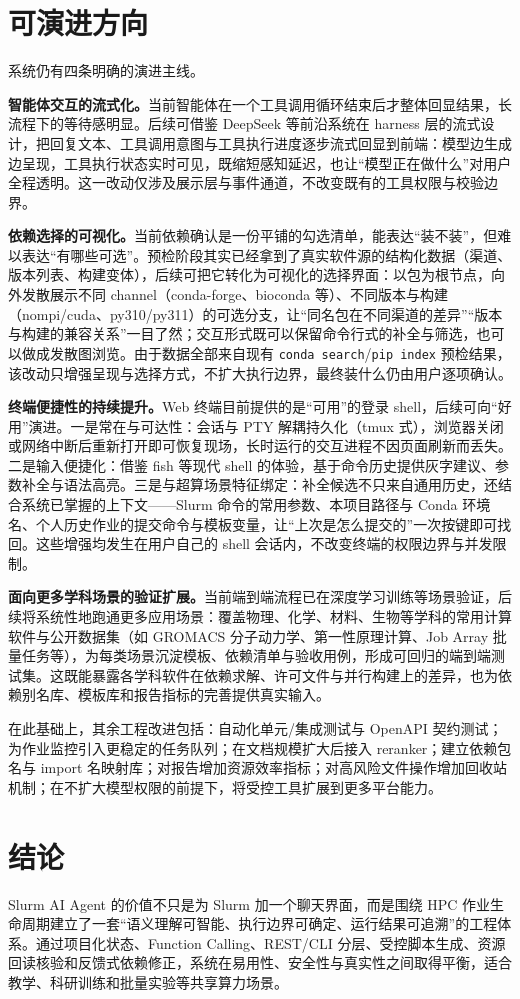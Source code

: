 \documentclass[UTF8,11pt,a4paper]{ctexart}
\newcommand{\code}[1]{\texttt{\small #1}}
\begin{document}
\section{可演进方向}
系统仍有四条明确的演进主线。

\textbf{智能体交互的流式化。}当前智能体在一个工具调用循环结束后才整体回显结果，长流程下的等待感明显。后续可借鉴 DeepSeek 等前沿系统在 harness 层的流式设计，把回复文本、工具调用意图与工具执行进度逐步流式回显到前端：模型边生成边呈现，工具执行状态实时可见，既缩短感知延迟，也让“模型正在做什么”对用户全程透明。这一改动仅涉及展示层与事件通道，不改变既有的工具权限与校验边界。

\textbf{依赖选择的可视化。}当前依赖确认是一份平铺的勾选清单，能表达“装不装”，但难以表达“有哪些可选”。预检阶段其实已经拿到了真实软件源的结构化数据（渠道、版本列表、构建变体），后续可把它转化为可视化的选择界面：以包为根节点，向外发散展示不同 channel（conda-forge、bioconda 等）、不同版本与构建（nompi/cuda、py310/py311）的可选分支，让“同名包在不同渠道的差异”“版本与构建的兼容关系”一目了然；交互形式既可以保留命令行式的补全与筛选，也可以做成发散图浏览。由于数据全部来自现有 \code{conda search}/\code{pip index} 预检结果，该改动只增强呈现与选择方式，不扩大执行边界，最终装什么仍由用户逐项确认。

\textbf{终端便捷性的持续提升。}Web 终端目前提供的是“可用”的登录 shell，后续可向“好用”演进。一是常在与可达性：会话与 PTY 解耦持久化（tmux 式），浏览器关闭或网络中断后重新打开即可恢复现场，长时运行的交互进程不因页面刷新而丢失。二是输入便捷化：借鉴 fish 等现代 shell 的体验，基于命令历史提供灰字建议、参数补全与语法高亮。三是与超算场景特征绑定：补全候选不只来自通用历史，还结合系统已掌握的上下文——Slurm 命令的常用参数、本项目路径与 Conda 环境名、个人历史作业的提交命令与模板变量，让“上次是怎么提交的”一次按键即可找回。这些增强均发生在用户自己的 shell 会话内，不改变终端的权限边界与并发限制。

\textbf{面向更多学科场景的验证扩展。}当前端到端流程已在深度学习训练等场景验证，后续将系统性地跑通更多应用场景：覆盖物理、化学、材料、生物等学科的常用计算软件与公开数据集（如 GROMACS 分子动力学、第一性原理计算、Job Array 批量任务等），为每类场景沉淀模板、依赖清单与验收用例，形成可回归的端到端测试集。这既能暴露各学科软件在依赖求解、许可文件与并行构建上的差异，也为依赖别名库、模板库和报告指标的完善提供真实输入。

在此基础上，其余工程改进包括：自动化单元/集成测试与 OpenAPI 契约测试；为作业监控引入更稳定的任务队列；在文档规模扩大后接入 reranker；建立依赖包名与 import 名映射库；对报告增加资源效率指标；对高风险文件操作增加回收站机制；在不扩大模型权限的前提下，将受控工具扩展到更多平台能力。

\section{结论}
Slurm AI Agent 的价值不只是为 Slurm 加一个聊天界面，而是围绕 HPC 作业生命周期建立了一套“语义理解可智能、执行边界可确定、运行结果可追溯”的工程体系。通过项目化状态、Function Calling、REST/CLI 分层、受控脚本生成、资源回读核验和反馈式依赖修正，系统在易用性、安全性与真实性之间取得平衡，适合教学、科研训练和批量实验等共享算力场景。
\end{document}
